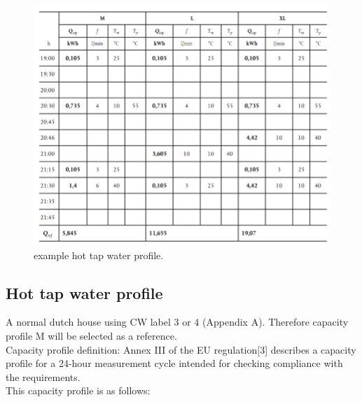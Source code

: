\documentclass[a4paper,10pt]{article}
\begin{document}
\begin{figure}[H]
\centering
\includegraphics[width=1\columnwidth]{pictures/hot tap water.png}
\caption[Short title]{example hot tap water profile.}
\label{fig:ff5}\end{figure}










\subsection{Hot tap water profile}
 
 
A normal dutch house using CW label 3 or 4 (Appendix A). Therefore capacity profile M will be selected as a reference.\\
Capacity profile definition:
Annex III of the EU regulation[3] describes a capacity profile for a 24-hour measurement cycle intended for checking compliance with the requirements.\\
This capacity profile is as follows:
\end{document}
